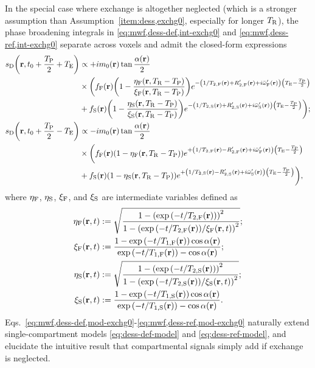 In the special case
where exchange is altogether neglected
(which is a stronger assumption
than Assumption~\ref{item:dess,exchg0},
especially for longer $T_\mathrm{R}$),
the phase broadening integrals 
in \eqref{eq:mwf,dess-def,int-exchg0} and \eqref{eq:mwf,dess-ref,int-exchg0}
separate across voxels
and admit the closed-form expressions
\begin{align}
	\dess\paren{\bmr,t_0+\frac{\TP}{2}+\TE} &\propto
		+i\mzero\pr \tan{\frac{\flip\pr}{2}} 
		\label{eq:mwf,dess-def,mod-exchg0} \\
	&\times 
		\bigg(
			\ff\pr \paren{1-\frac{\etaf\paren{\bmr,\TR-\TP}}{\xif\paren{\bmr,\TR-\TP}}}
			e^{-\paren{1/\tf{2}\pr+\Rtpf\pr+i\ompfmed\pr}\paren{\TE-\frac{\TP}{2}}}
			\nonumber \\
	&+	
			\fs\pr \paren{1-\frac{\etas\paren{\bmr,\TR-\TP}}{\xis\paren{\bmr,\TR-\TP}}}
			e^{-\paren{1/\ts{2}\pr+\Rtps\pr+i\ompsmed\pr}\paren{\TE-\frac{\TP}{2}}}
		\bigg);
		\nonumber \\
	\dess\paren{\bmr,t_0+\frac{\TP}{2}-\TE} &\propto
		-i\mzero\pr \tan{\frac{\flip\pr}{2}}
		\label{eq:mwf,dess-ref,mod-exchg0} \\
	&\times
		\bigg(
			\ff\pr \paren{1-\etaf\paren{\bmr,\TR-\TP}}
			e^{+\paren{1/\tf{2}\pr-\Rtpf\pr+i\ompfmed\pr}\paren{\TE-\frac{\TP}{2}}}
			\nonumber \\
	&+
			\fs\pr \paren{1-\etas\paren{\bmr,\TR-\TP}}
			e^{+\paren{1/\ts{2}\pr-\Rtps\pr+i\ompsmed\pr}\paren{\TE-\frac{\TP}{2}}}
		\bigg),
		\nonumber
\end{align}
where $\eta_{\mathrm{F}}$, $\eta_{\mathrm{S}}$, $\xi_{\mathrm{F}}$, and $\xi_{\mathrm{S}}$ 
are intermediate variables defined as
\begin{align}
	\etaf\prt &:=
		\sqrt{\frac{1-\paren{\expa{-t/\tf{2}\pr}}^2}
		{1-\paren{\expa{-t/\tf{2}\pr}/\xif\prt}^2}};
		\nonumber \\
	\xif\prt &:=
		\frac{1-\expa{-t/\tf{1}\pr}\cos{\flip\pr}}
		{\expa{-t/\tf{1}\pr}-\cos{\flip\pr}};
		\nonumber \\
	\etas\prt &:=
		\sqrt{\frac{1-\paren{\expa{-t/\ts{2}\pr}}^2}
		{1-\paren{\expa{-t/\ts{2}\pr}/\xis\prt}^2}};
		\nonumber \\
	\xis\prt &:=
		\frac{1-\expa{-t/\ts{1}\pr}\cos{\flip\pr}}
		{\expa{-t/\ts{1}\pr}-\cos{\flip\pr}}.
		\nonumber
\end{align}
Eqs.~\eqref{eq:mwf,dess-def,mod-exchg0}-\eqref{eq:mwf,dess-ref,mod-exchg0}
naturally extend single-compartment models
\eqref{eq:dess-def-model} and \eqref{eq:dess-ref-model},
and elucidate the intuitive result
that compartmental signals simply add
if exchange is neglected.

